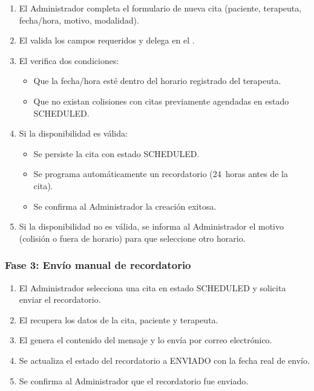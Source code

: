 \begin{enumerate}
  \item El Administrador completa el formulario de nueva cita (paciente, terapeuta, fecha/hora, motivo, modalidad).
  \item El  valida los campos requeridos y delega en el .
  \item El  verifica dos condiciones:
  \begin{itemize}
    \item Que la fecha/hora esté dentro del horario registrado del terapeuta.
    \item Que no existan colisiones con citas previamente agendadas en estado SCHEDULED.
  \end{itemize}
  \item Si la disponibilidad es válida:
  \begin{itemize}
    \item Se persiste la cita con estado SCHEDULED.
    \item Se programa automáticamente un recordatorio (24~horas antes de la cita).
    \item Se confirma al Administrador la creación exitosa.
  \end{itemize}
  \item Si la disponibilidad no es válida, se informa al Administrador el motivo (colisión o fuera de horario) para que seleccione otro horario.
\end{enumerate}

\subsubsection{Fase 3: Envío manual de recordatorio}

\begin{enumerate}
  \item El Administrador selecciona una cita en estado SCHEDULED y solicita enviar el recordatorio.
  \item El  recupera los datos de la cita, paciente y terapeuta.
  \item El  genera el contenido del mensaje y lo envía por correo electrónico.
  \item Se actualiza el estado del recordatorio a ENVIADO con la fecha real de envío.
  \item Se confirma al Administrador que el recordatorio fue enviado.
\end{enumerate}

